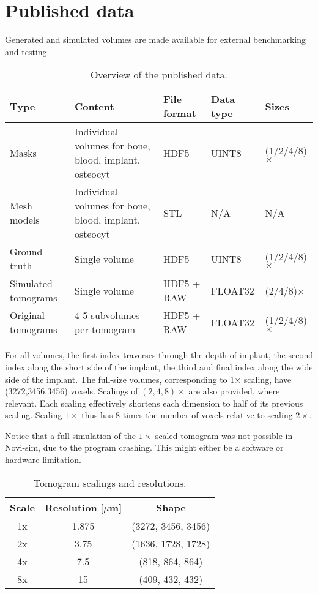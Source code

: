 \section{Published data}
\label{sec:pubdata}

Generated and simulated volumes are made available for external benchmarking and testing.

\begin{table*}
    \caption{Overview of the published data.}
    \label{tab:pubdata}
    \centering
    \begin{tabular}{@{}p{2cm}p{5cm}p{2.5cm}p{2.5cm}p{2.5cm}@{}}
    \toprule
	    \textbf{Type} & \textbf{Content} & \textbf{File format} & \textbf{Data type} & \textbf{Sizes} \\
    \midrule
	    Masks & Individual volumes for bone, blood, implant, osteocyt & HDF5 & UINT8 & (1/2/4/8)$\times$ \\
	    Mesh models & Individual volumes for bone, blood, implant, osteocyt & STL & N/A & N/A \\
	    Ground truth & Single volume & HDF5 & UINT8 & (1/2/4/8)$\times$ \\
	    Simulated tomograms & Single volume & HDF5 + RAW & FLOAT32 & (2/4/8)$\times$ \\
	    Original tomograms & 4-5 subvolumes per tomogram & HDF5 + RAW & FLOAT32 & (1/2/4/8)$\times$ \\
    \bottomrule
    \end{tabular}
\end{table*}

For all volumes, the first index traverses through the depth of implant, the second index along the short side of the implant, the third and final index along the wide side of the implant. The full-size volumes, corresponding to 1$\times$ scaling, have (3272,3456,3456) voxels. Scalings of $(2,4,8)\times$ are also provided, where relevant. Each scaling effectively shortens each dimension to half of its previous scaling. Scaling $1\times$ thus has 8 times the number of voxels relative to scaling $2\times$.

Notice that a full simulation of the $1\times$ scaled tomogram was not possible in Novi-sim, due to the program crashing. This might either be a software or hardware limitation.

\begin{table}[]
\caption{Tomogram scalings and resolutions.}
\label{tab:tomogram_scales}
\centering
\begin{tabular}{ccc}
\toprule
Scale & Resolution $[\mu$m] & Shape \\ \midrule
1x & 1.875 & (3272, 3456, 3456) \\
2x & 3.75  & (1636, 1728, 1728) \\
4x & 7.5   & (818, 864, 864)    \\
8x & 15    & (409, 432, 432)    \\ \bottomrule
\end{tabular}
\end{table}

